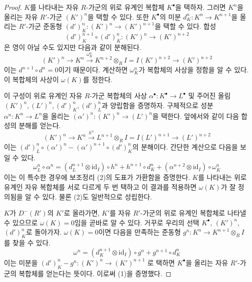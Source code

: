 \begin{proof}
$K$를 나타내는 자유 $R$-가군의 위로 유계인 복합체 $K^\bullet$을
택하자. 그러면 $K^n$을 올리는 자유 $R'$-가군 $(K')^n$을 택할 수 있다.
또한 $K^\bullet$의 미분 $d^n_K : K^n \to K^{n + 1}$을 올리는
$R'$-가군 준동형 $(d')^n_K : (K')^n \to (K')^{n + 1}$을 택할 수 있다.
합성
$$
(d')^{n + 1}_K \circ (d')^n_K : (K')^n \to (K')^{n + 2}
$$
은 영이 아닐 수도 있지만 다음과 같이 분해된다.
$$
(K')^n \to K^n \xrightarrow{\omega^n_K}
K^{n + 2} \otimes_R I = I(K')^{n + 2} \to (K')^{n + 2}
$$
이는 $d^{n + 1} \circ d^n = 0$이기 때문이다. 계산하면
$\omega^n_K$가 복합체의 사상을 정함을 알 수 있다. 이 복합체의 사상이
$\omega(K)$를 정한다.

\medskip\noindent
이 구성이 위로 유계인 자유 $R$-가군 복합체의 사상
$\alpha^\bullet : K^\bullet \to L^\bullet$ 및 주어진 올림
$(K')^n, (L')^n, (d')^n_K, (d')^n_L$과 양립함을 증명하자. 구체적으로
성분 $\alpha^n : K^n \to L^n$을 올리는
$(\alpha')^n : (K')^n \to (L')^n$을 택한다. 앞에서와 같이
다음 합성의 분해를 얻는다.
$$
(K')^n \to K^n \xrightarrow{h^n}
L^{n + 1} \otimes_R I = I(L')^{n + 1} \to (L')^{n + 2}
$$
이는 $(d')^n_L \circ (\alpha')^n -
(\alpha')^{n + 1} \circ (d')_K^n$의 분해이다. 간단한 계산으로
다음을 보일 수 있다.
$$
\omega^n_L \circ \alpha^n =
(d_L^{n + 1} \otimes \text{id}_I) \circ h^n + h^{n + 1} \circ d_K^n +
(\alpha^{n + 2} \otimes \text{id}_I) \circ \omega^n_K
$$
이는 이 특수한 경우에 보조정리 (2)의 도표가 가환함을 증명한다.
$K$를 나타내는 위로 유계인 자유 복합체를 서로 다르게 두 번 택하고
이 결과를 적용하면 $\omega(K)$가 잘 정의됨을 알 수 있다. 물론
(2)도 일반적으로 성립한다.

\medskip\noindent
$K$가 $D^-(R')$의 $K'$로 올라가면, $K'$를 자유 $R'$-가군의 위로
유계인 복합체로 나타낼 수 있으므로 $\omega(K) = 0$임을 곧바로 알 수
있다. 거꾸로 우리의 선택 $K^\bullet$, $(K')^n$, $(d')^n_K$로
돌아가자. $\omega(K) = 0$이면 다음을 만족하는 준동형
$g^n : K^n \to K^{n + 1} \otimes_R I$를 찾을 수 있다.
$$
\omega^n = (d_K^{n + 1} \otimes \text{id}_I) \circ g^n +
g^{n + 1} \circ d_K^n
$$
이는 미분을
$(d')^n_K - g^n : (K')^n \to (K')^{n + 1}$
로 택하면 $K^\bullet$을 올리는 자유 $R'$-가군의 복합체를 얻는다는
뜻이다. 이로써 (1)을 증명했다.


\end{proof}
